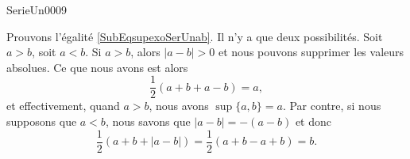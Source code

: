 

\begin{corrige}{SerieUn0009}

	Prouvons l'égalité \eqref{SubEqsupexoSerUnab}. Il n'y a que deux possibilités. Soit $a>b$, soit $a<b$. Si $a>b$, alors $| a-b |>0$ et nous pouvons supprimer les valeurs absolues. Ce que nous avons est alors
	\begin{equation}
		\frac{ 1 }{2}(a+b+a-b)=a,
	\end{equation}
	et effectivement, quand $a>b$, nous avons $\sup\{ a,b \}=a$. Par contre, si nous supposons que $a<b$, nous savons que $| a-b |=-(a-b)$ et donc
	\begin{equation}
		\frac{ 1 }{2}(a+b+| a-b |)=\frac{ 1 }{2}(a+b-a+b)=b.
	\end{equation}

\end{corrige}
